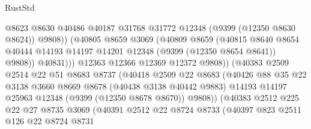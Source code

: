\begin{lexlean}{RustStd}
\begin{coremodule}
                                @8623
                                @8630
                                @40486
                                @40187
                                @31768
                                @31772
                                @12348
                                (@9399 (@12350 @8630 @8624))
                                @9808))
                            (@40805
                              @8659
                              @3069
                              (@40809
                                @8659
                                (@40815
                                  @8640
                                  @8654
                                  @40444
                                  @14193
                                  @14197
                                  @14201
                                  @12348
                                  (@9399 (@12350 @8654 @8641))
                                  @9808))
                              @40831)))
                        @12363
                        @12366
                        @12369
                        @12372
                        @9808))
                    (@40383
                      @2509
                      @2514
                      @22
                      @51
                      @8683
                      @8737
                      (@40418
                        @2509
                        @22
                        @8683
                        (@40426
                          @88
                          @35
                          @22
                          @3138
                          @3660
                          @8669
                          @8678
                          (@40438 @3138 @40442 @9883)
                          @14193
                          @14197
                          @25963
                          @12348
                          (@9399 (@12350 @8678 @8670))
                          @9808))
                      (@40383
                        @2512
                        @225
                        @22
                        @27
                        @8735
                        @3069
                        (@40391
                          @2512
                          @22
                          @8724
                          @8733
                          (@40397
                            @823
                            @2511
                            @126
                            @22
                            @8724
                            @8731

\end{coremodule}
\end{lexlean}
